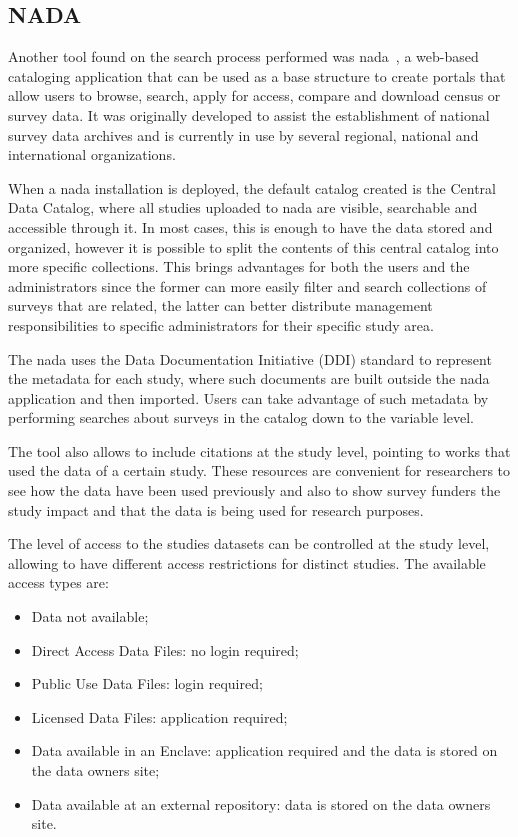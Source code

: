 \subsection*{NADA}
Another tool found on the search process performed was \gls{nada}~\cite{nada}, a web-based cataloging application that can be used as a base structure to create portals that allow users to browse, search, apply for access, compare and download census or survey data.
It was originally developed to assist the establishment of national survey data archives and is currently in use by several regional, national and international organizations.

When a \gls{nada} installation is deployed, the default catalog created is the Central Data Catalog, where all studies uploaded to \gls{nada} are visible, searchable and accessible through it.
In most cases, this is enough to have the data stored and organized, however it is possible to split the contents of this central catalog into more specific collections.
This brings advantages for both the users and the administrators since the former can more easily filter and search collections of surveys that are related, the latter can better distribute management responsibilities to specific administrators for their specific study area.

The \gls{nada} uses the Data Documentation Initiative (DDI) standard to represent the metadata for each study, where such documents are built outside the \gls{nada} application and then imported.
Users can take advantage of such metadata by performing searches about surveys in the catalog down to the variable level.

The tool also allows to include citations at the study level, pointing to works that used the data of a certain study.
These resources are convenient for researchers to see how the data have been used previously and also to show survey funders the study impact and that the data is being used for research purposes.

The level of access to the studies datasets can be controlled at the study level, allowing to have different access restrictions for distinct studies.
The available access types are:
\begin{itemize}
    \item Data not available;
    \item Direct Access Data Files: no login required;
    \item Public Use Data Files: login required;
    \item Licensed Data Files: application required;
    \item Data available in an Enclave: application required and the data is stored on the data owners site;
    \item Data available at an external repository:  data is stored on the data owners site.
\end{itemize}

